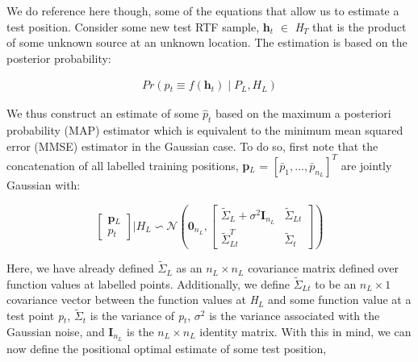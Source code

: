 \documentclass{article}
\begin{document}
We do reference here though, some of the equations that allow us to estimate a test position. Consider some new test RTF sample, \textbf{h}$_t$ $\in$ \textit{H}$_T$ that is the product of some unknown source at an unknown location. The estimation is based on the posterior probability:

\begin{equation} \label{posterior}
    \begin{aligned}
        Pr\left(\textit{p$_t$} \equiv \textit{f}\left(\textbf{h}_\textit{t}\right) \mid \textit{P$_L$}, \textit{H$_L$} \right)
    \end{aligned}
\end{equation}

We thus construct an estimate of some \textit{$\hat{p}_t$} based on the maximum a posteriori probability (MAP) estimator which is equivalent to the minimum mean squared error (MMSE) estimator in the Gaussian case. To do so, first note that the concatenation of all labelled training positions, \textbf{p}$_\textit{L}$ = $\left[\textit{$\bar{p}_1$},...,\textit{$\bar{p}_{n_L}$}\right]^T$ are jointly Gaussian with:

\begin{equation} \label{concat_pos_est}
    \begin{bmatrix}
        \textbf{p$_L$}\\
        \textit{p$_t$}
    \end{bmatrix}\rvert \textit{H$_L$} \backsim \mathcal{N}\left(\textbf{0}_{\textit{n}_L}, 
    \begin{bmatrix}
        \textbf{$\tilde{\Sigma}$}_\textit{L} + \textit{$\sigma^2$}\textbf{I}_{\textit{n$_L$}} & \textit{$\tilde{\Sigma}$}_\textit{Lt}\\
        \textbf{$\tilde{\Sigma}$}_\textit{Lt}^T & \textit{$\tilde{\Sigma}$}_\textit{t}
    \end{bmatrix}
    \right)
\end{equation}

Here, we have already defined \textbf{$\tilde{\Sigma}_{L}$} as an $\textit{n$_L$} \times \textit{n$_L$}$ covariance matrix defined over function values at labelled points. Additionally, we define \textit{$\tilde{\Sigma}_{Lt}$} to be an $\textit{n$_L$} \times 1$ covariance vector between the function values at \textit{H}$_L$ and some function value at a test point \textit{p$_t$}, \textit{$\tilde{\Sigma}_t$} is the variance of \textit{p$_t$},  \textit{$\sigma^2$} is the variance associated with the Gaussian noise, and \textbf{I$_{\textit{{n}$_L$}}$} is the $\textit{n$_L$} \times \textit{n$_L$}$ identity matrix. With this in mind, we can now define the positional optimal estimate of some test position,
\end{document}
